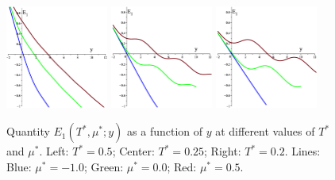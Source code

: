 \documentclass[12pt]{article}
\numberwithin{equation}{section}
\begin{document}
	\begin{figure}[htbp]
		\includegraphics[width=0.3\textwidth,angle=0]{images/E1y_vs_y_a1}
		\hfill
		\includegraphics[width=0.3\textwidth,angle=0]{images/E1y_vs_y_a2}
		\hfill
		\includegraphics[width=0.3\textwidth,angle=0]{images/E1y_vs_y_a3}
		\\
		\vfill
		\parbox{0.95\textwidth}{\caption{\label{fig:E1y_vs_y_a} Quantity $E_1(T^*,\mu^*;y)$ as a function of $y$ at different values of $T^*$ and $\mu^*$. Left: $T^*=0.5$; Center: $T^*=0.25$; Right: $T^*=0.2$. Lines: Blue: $\mu^*=-1.0$; Green: $\mu^*=0.0$; Red: $\mu^*=0.5$.}}
		
	\end{figure}
	
\end{document}
